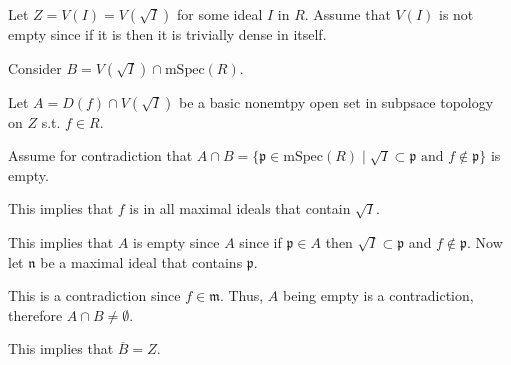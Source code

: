 \documentclass[12pt, letterpaper]{article}
\newcommand{\p}{\mathfrak{p}}
\renewcommand{\t}[1]{\text{#1}}
\newcommand{\mf}[1]{\mathfrak{#1}}
\begin{document}
\begin{problemproof}
    Let $Z=V(I)=V(\sqrt{I})$ for some ideal $I$ in $R$. Assume that $V(I)$ is not empty since if it is then it is trivially dense in itself.

    Consider $B=V(\sqrt{I}) \cap \mathrm{mSpec}(R)$.

    Let $A=D(f) \cap V(\sqrt{I})$ be a basic nonemtpy open set in subpsace topology on $Z$ s.t. $f \in R$.

    Assume for contradiction that $A \cap B=\{\p \in \mathrm{mSpec}(R) \mid \sqrt{I} \subset \p \t{ and } f \notin \p\}$ is empty.
    
    This implies that $f$ is in all maximal ideals that contain $\sqrt{I}$.

    This implies that $A$ is empty since $A$ since if $\p \in A$ then $\sqrt{I} \subset \p$ and $f \notin \p$. Now let $\mf{n}$ be a maximal ideal that contains $\p$.

    This is a contradiction since $f \in \mf{m}$. Thus, $A$ being empty is a contradiction, therefore $A \cap B \neq \emptyset$.

    This implies that $\overline{B} = Z$.
\end{problemproof}
\end{document}
